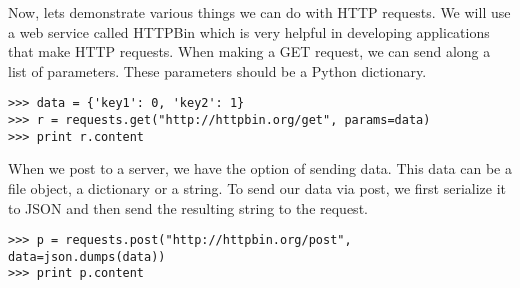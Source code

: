 Now, lets demonstrate various things we can do with HTTP requests.
We will use a web service called HTTPBin which is very helpful in developing applications that make HTTP requests.
When making a GET request, we can send along a list of parameters.
These parameters should be a Python dictionary.
\begin{lstlisting}
>>> data = {'key1': 0, 'key2': 1}
>>> r = requests.get("http://httpbin.org/get", params=data)
>>> print r.content
\end{lstlisting}

When we post to a server, we have the option of sending data.
This data can be a file object, a dictionary or a string.
To send our data via post, we first serialize it to JSON and then send the resulting string to the request.
\begin{lstlisting}
>>> p = requests.post("http://httpbin.org/post", data=json.dumps(data))
>>> print p.content
\end{lstlisting}


